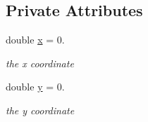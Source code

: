 \subsection*{Private Attributes}
\begin{DoxyCompactItemize}
\item 
double \mbox{\hyperlink{class_jinks_draw_1_1_point_a49a46c3d78c0c68260d55dacdee458de}{x}} = 0.
\begin{DoxyCompactList}\small\item\em the x coordinate \end{DoxyCompactList}\item 
double \mbox{\hyperlink{class_jinks_draw_1_1_point_ad2dbfbd07baf41cfe82737a4f347bab5}{y}} = 0.
\begin{DoxyCompactList}\small\item\em the y coordinate \end{DoxyCompactList}\end{DoxyCompactItemize}

